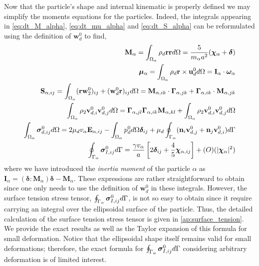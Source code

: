 Now that the particle's shape and internal kinematic is properly defined we may simplify the moments equations for the particles. 
Indeed, the integrals appearing in \ref{eq:dt_M_alpha}, \ref{eq:dt_mu_alpha} and \ref{eq:dt_S_alpha} can be reformulated using the definition of $\textbf{w}_d^0$ to find, 
\begin{align}
    \textbf{M}_\alpha 
    = \int_{\Omega_{\alpha}}  \rho_d \textbf{rr}  d\Omega
    = \frac{5}{m_\alpha a^2} (\bm\chi_\alpha+\bm\delta)\\
    \bm\mu_\alpha 
    = \int_{\Omega_{\alpha}}  \rho_d \textbf{r}\times\textbf{u}_d^0  d\Omega
    = \textbf{I}_\alpha \cdot \bm\omega_\alpha\\
    \textbf{S}_{\alpha,ij} = \int_{\Omega_{\alpha}} (\textbf{rw}_ 2^0 )_{ij}+ (\textbf{w}_d^0 \textbf{r})_{ij} d\Omega 
    = \textbf{M}_{\alpha,ik} \cdot \bm\Gamma_{\alpha,jk}
        +  \bm\Gamma_{\alpha,ik} \cdot \textbf{M}_{\alpha,jk}
    \\
    \int_{\Omega_{\alpha}} \rho_2 \textbf{v}_{d,i}^0\textbf{v}_{d,j}^0 d\Omega
    = \bm\Gamma_{\alpha,jl}\bm\Gamma_{\alpha,ik} \textbf{M}_{\alpha,kl}  
    +\int_{\Omega_{\alpha}} \rho_2 \textbf{v}_{d,i}^0\textbf{v}_{d,j}^0 d\Omega
    \label{eq:ww_def}
    \\
    \label{eq:sigma_d_def}
    \int_{\Omega_{\alpha}} \bm\sigma_{d,ij}^0 d\Omega
    =
    2 \mu_d v_\alpha \textbf{E}_{\alpha,ij}
    - \int_{\Omega_{\alpha}} p_d^0 d\Omega \bm\delta_{ij}
    + \mu_d \oint_{\Gamma_{\alpha}} (\textbf{n}_i \textbf{v}_{d,j}^0 + \textbf{n}_j \textbf{v}_{d,i}^0) d\Gamma
    \\
    \oint_{\Gamma_{\alpha}} \bm\sigma_{I,ij}^0 d\Gamma
    = \frac{\gamma v_\alpha }{a} \left[
        2\bm\delta_{ij} 
        + \frac{4  }{5} \bm\chi_{\alpha,ij}
    \right]
    +\mathcal(O)(|\bm\chi_\alpha|^2)
\end{align}
where we have introduced the \textit{inertia moment} of the particle $\alpha$ as $\textbf{I}_\alpha = (\bm\delta : \textbf{M}_\alpha)\bm\delta - \textbf{M}_\alpha$. 
These expressions are rather straightforward to obtain since one only needs to use the definition of $\textbf{w}_d^0$ in these integrals. 
However, the surface tension stress tensor, $\oint_{\Gamma_{\alpha}} \bm\sigma_{I,ij}^0 d\Gamma$, is not so easy to obtain since it require carrying an integral over the ellipsoidal surface of the particle.
Thus, the detailed calculation of the surface tension stress tensor is given in \ref{ap:surface_tension}. 
We provide the exact results as well as the Taylor expansion of this formula for small deformation. 
Notice that the ellipsoidal shape itself remains valid for small deformations; therefore, the exact formula for $\oint_{\Gamma_{\alpha}} \bm\sigma_{I,ij}^0 d\Gamma$ considering arbitrary deformation is of limited interest. 
